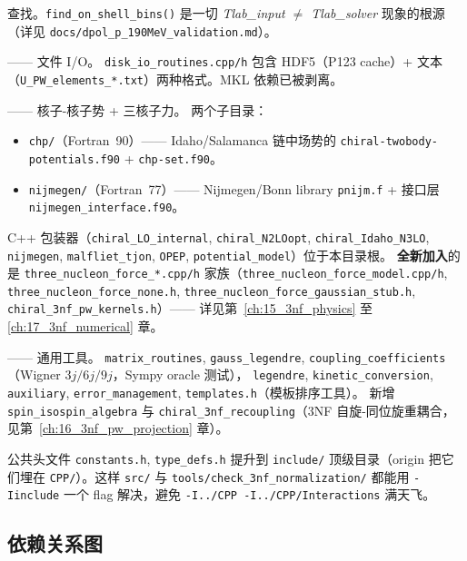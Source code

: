 \begin{description}
\begin{itemize}
         查找。\texttt{find\_on\_shell\_bins()} 是一切 \emph{Tlab\_input
         $\neq$ Tlab\_solver} 现象的根源（详见
         \texttt{docs/dpol\_p\_190MeV\_validation.md}）。
   \end{itemize}
\item[\texttt{src/io/}] —— 文件 I/O。
   \texttt{disk\_io\_routines.cpp/h} 包含 HDF5（P123 cache）+ 文本
   （\texttt{U\_PW\_elements\_*.txt}）两种格式。MKL 依赖已被剥离。
\item[\texttt{src/interactions/}] —— 核子-核子势 + 三核子力。
   两个子目录：
   \begin{itemize}
   \item \texttt{chp/}（Fortran~90）—— Idaho/Salamanca 链中场势的
         \texttt{chiral-twobody-potentials.f90} + \texttt{chp-set.f90}。
   \item \texttt{nijmegen/}（Fortran~77）—— Nijmegen/Bonn library
         \texttt{pnijm.f} + 接口层 \texttt{nijmegen\_interface.f90}。
   \end{itemize}
   C++ 包装器（\texttt{chiral\_LO\_internal}, \texttt{chiral\_N2LOopt},
   \texttt{chiral\_Idaho\_N3LO}, \texttt{nijmegen}, \texttt{malfliet\_tjon},
   \texttt{OPEP}, \texttt{potential\_model}）位于本目录根。
   \textbf{全新加入}的是 \texttt{three\_nucleon\_force\_*.cpp/h}
   家族（\texttt{three\_nucleon\_force\_model.cpp/h},
   \texttt{three\_nucleon\_force\_none.h},
   \texttt{three\_nucleon\_force\_gaussian\_stub.h},
   \texttt{chiral\_3nf\_pw\_kernels.h}）—— 详见第~\ref{ch:15_3nf_physics}
   至 \ref{ch:17_3nf_numerical} 章。
\item[\texttt{src/utils/}] —— 通用工具。
   \texttt{matrix\_routines}, \texttt{gauss\_legendre},
   \texttt{coupling\_coefficients}（Wigner $3j/6j/9j$，Sympy oracle 测试），
   \texttt{legendre}, \texttt{kinetic\_conversion}, \texttt{auxiliary},
   \texttt{error\_management}, \texttt{templates.h}（模板排序工具）。
   新增 \texttt{spin\_isospin\_algebra} 与
   \texttt{chiral\_3nf\_recoupling}（3NF 自旋-同位旋重耦合，
   见第~\ref{ch:16_3nf_pw_projection} 章）。
\end{description}

公共头文件 \texttt{constants.h}, \texttt{type\_defs.h} 提升到
\texttt{include/} 顶级目录（origin 把它们埋在 \texttt{CPP/}）。这样
\texttt{src/} 与 \texttt{tools/check\_3nf\_normalization/} 都能用
\texttt{-Iinclude} 一个 flag 解决，避免 \texttt{-I../CPP -I../CPP/Interactions}
满天飞。

\subsection{依赖关系图}

